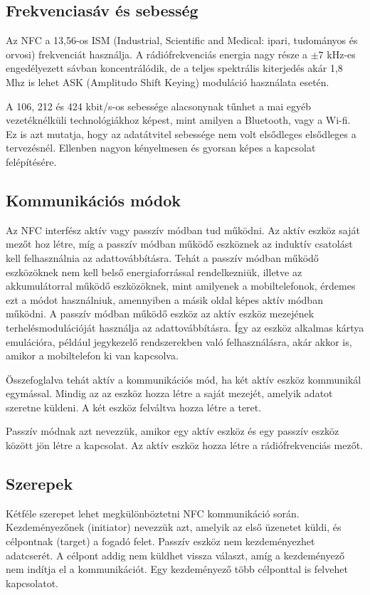 \documentclass[12pt]{article}
\begin{document}
\subsection{Frekvenciasáv és sebesség}
Az NFC a 13,56-os ISM (Industrial, Scientific and Medical: ipari, tudományos
és orvosi) frekvenciát használja. A rádiófrekvenciás energia nagy része a 
$\pm 7$ kHz-es engedélyezett sávban koncentrálódik, de a teljes spektrális 
kiterjedés akár 1,8 Mhz is lehet ASK (Amplitudo Shift Keying)
moduláció használata esetén.

A 106, 212 és 424 kbit/s-os sebessége alacsonynak tűnhet a mai egyéb
vezetéknélküli technológiákhoz képest, mint amilyen a Bluetooth, vagy a Wi-fi.
Ez is azt mutatja, hogy az adatátvitel sebessége nem volt elsődleges elsődleges
a tervezésnél. Ellenben nagyon kényelmesen és gyorsan képes a kapcsolat
felépítésére.

\subsection{Kommunikációs módok}
Az NFC interfész aktív vagy passzív módban tud működni. Az aktív eszköz saját
mezőt hoz létre, míg a passzív módban működő eszköznek az induktív csatolást
kell felhasználnia az adattovábbításra. Tehát a passzív módban működő eszközöknek
nem kell belső energiaforrással rendelkezniük, illetve az akkumulátorral működő
eszközöknek, mint amilyenek a mobiltelefonok, érdemes ezt a módot használniuk, 
amennyiben a másik oldal képes aktív módban működni. A passzív módban működő
eszköz az aktív eszköz mezejének terhelésmodulációját használja az
adattovábbításra. Így az eszköz alkalmas kártya emulációra, például 
jegykezelő rendszerekben való felhasználásra, akár  akkor is, amikor a mobiltelefon
ki van kapcsolva.

Összefoglalva tehát aktív a kommunikációs mód, ha két aktív eszköz kommunikál 
egymással. Mindig az az eszköz hozza létre a saját mezejét, amelyik adatot
szeretne küldeni. A két eszköz felváltva hozza létre a teret.

Passzív módnak azt nevezzük, amikor egy aktív eszköz és egy passzív eszköz között
jön létre a kapcsolat. Az aktív eszköz hozza létre a rádiófrekvenciás mezőt.

\subsection{Szerepek}
Kétféle szerepet lehet megkülönböztetni NFC kommunikáció során. Kezdeményezőnek 
(initiator) nevezzük azt, amelyik az első üzenetet küldi, és célpontnak (target)
a fogadó felet. Passzív eszköz nem kezdeményezhet adatcserét. A célpont addig 
nem küldhet vissza választ, amíg a kezdeményező nem indítja el a kommunikációt.
Egy kezdeményező több célponttal is felvehet kapcsolatot.
\end{document}
